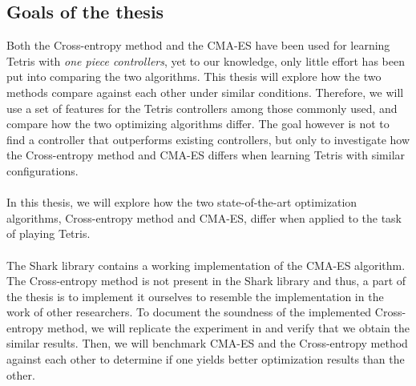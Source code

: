 \subsection{Goals of the thesis}

Both the Cross-entropy method and the CMA-ES have been used 
for learning Tetris with \textit{one piece controllers}, 
yet to our knowledge, only little effort has been put into 
comparing the two algorithms. This thesis will explore
how the two methods compare against each other under similar
conditions. Therefore, we will use a set of features for the 
Tetris controllers among those
commonly used, and compare how the two optimizing algorithms 
differ. The goal however is not to find a controller that 
outperforms existing controllers, but only to investigate 
how the Cross-entropy method and CMA-ES differs when learning Tetris
with similar configurations.\\
\\
In this thesis, we will explore how the two state-of-the-art
optimization algorithms, Cross-entropy method and CMA-ES, differ when 
applied to the task of playing Tetris.\\
\\
The Shark library \citep{shark08} contains a
working implementation of the CMA-ES 
algorithm. The Cross-entropy method 
is not present in the Shark library and thus, 
a part of the thesis is to implement it ourselves to resemble
the implementation in
the work of other researchers. To document the 
soundness of the implemented Cross-entropy method, 
we will replicate the experiment in \citep{scherrer2009} and 
verify that we obtain the similar results.
Then, we will benchmark CMA-ES and the Cross-entropy method against each other 
to determine if one yields better optimization results than the other.
